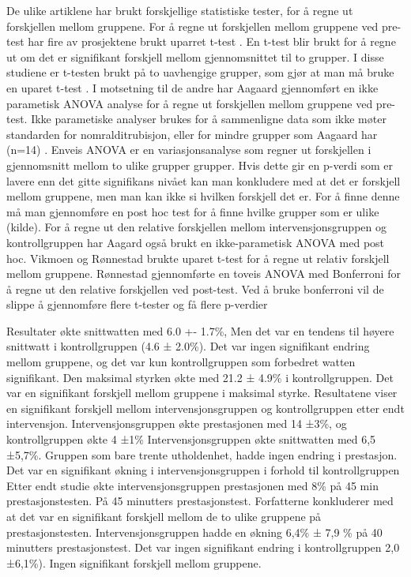 \documentclass[
]{book}
\begin{document}
De ulike artiklene har brukt forskjellige statistiske tester, for å regne ut forskjellen mellom gruppene. For å regne ut forskjellen mellom gruppene ved pre-test har fire av prosjektene brukt uparret t-test \citep{rønnestad2010a, rønnestad2010b, rønnestad2015, vikmoen2016}. En t-test blir brukt for å regne ut om det er signifikant forskjell mellom gjennomsnittet til to grupper. I disse studiene er t-testen brukt på to uavhengige grupper, som gjør at man må bruke en uparet t-test \citet{kim2015} . I motsetning til de andre har Aagaard \citep{aagaard2011} gjennomført en ikke parametisk ANOVA analyse for å regne ut forskjellen mellom gruppene ved pre-test. Ikke parametiske analyser brukes for å sammenligne data som ikke møter standarden for nomralditrubisjon, eller for mindre grupper som Aagaard har (n=14) \citep{altman2009}. Enveis ANOVA er en variasjonsanalyse som regner ut forskjellen i gjennomsnitt mellom to ulike grupper grupper. Hvis dette gir en p-verdi som er lavere enn det gitte signifikans nivået kan man konkludere med at det er forskjell mellom gruppene, men man kan ikke si hvilken forskjell det er. For å finne denne må man gjennomføre en post hoc test for å finne hvilke grupper som er ulike (kilde). For å regne ut den relative forskjellen mellom intervensjonsgruppen og kontrollgruppen har Aagard også brukt en ikke-parametisk ANOVA med post hoc. Vikmoen \citep{vikmoen2016} og Rønnestad \citep{rønnestad2015} brukte uparet t-test for å regne ut relativ forskjell mellom gruppene. Rønnestad \citep{rønnestad2010a, rønnestad2010b} gjennomførte en toveis ANOVA med Bonferroni for å regne ut den relative forskjellen ved post-test. Ved å bruke bonferroni vil de slippe å gjennomføre flere t-tester og få flere p-verdier

Resultater \citep{rønnestad2010b} økte snittwatten med 6.0 +- 1.7\%, Men det var en tendens til høyere snittwatt i kontrollgruppen (4.6 ± 2.0\%). Det var ingen signifikant endring mellom gruppene, og det var kun kontrollgruppen som forbedret watten signifikant. Den maksimal styrken økte med 21.2 ± 4.9\% i kontrollgruppen. Det var en signifikant forskjell mellom gruppene i maksimal styrke. \citet{rønnestad2010a} Resultatene viser en signifikant forskjell mellom intervensjonsgruppen og kontrollgruppen etter endt intervensjon. Intervensjonsgruppen økte prestasjonen med 14 ±3\%, og kontrollgruppen økte 4 ±1\% \citet{rønnestad2015} Intervensjonsgruppen økte snittwatten med 6,5 ±5,7\%. Gruppen som bare trente utholdenhet, hadde ingen endring i prestasjon. Det var en signifikant økning i intervensjonsgruppen i forhold til kontrollgruppen \citet{aagaard2011} Etter endt studie økte intervensjonsgruppen prestasjonen med 8\% på 45 min prestasjonstesten. På 45 minutters prestasjonstest. Forfatterne konkluderer med at det var en signifikant forskjell mellom de to ulike gruppene på prestasjonstesten. \citet{vikmoen2016} Intervensjonsgruppen hadde en økning 6,4\% ± 7,9 \% på 40 minutters prestasjonstest. Det var ingen signifikant endring i kontrollgruppen 2,0 ±6,1\%). Ingen signifikant forskjell mellom gruppene.
\end{document}
